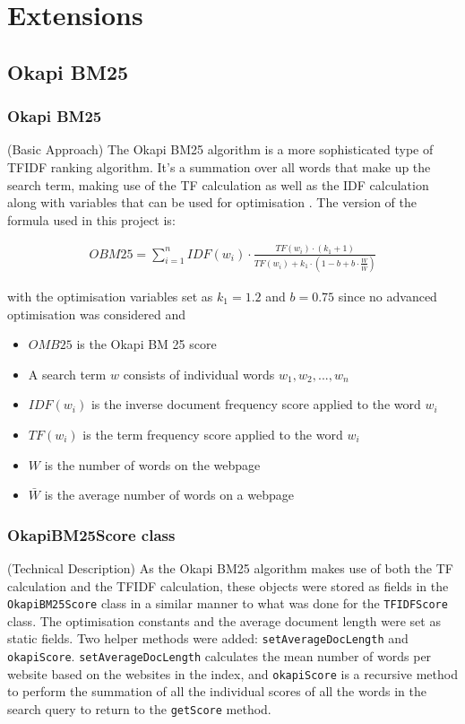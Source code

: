 \chapter{Extensions}


\section{Okapi BM25}

\subsection{Okapi BM25} (Basic Approach)
The Okapi BM25 algorithm is a more sophisticated type of TFIDF ranking algorithm.
It's a summation over all words that make up the search term, making use of the TF calculation as well as the IDF calculation along with variables that can be used for optimisation \citep{robertson2009probabilistic}.
The version of the formula used in this project is:

\begin{align}
    OBM25 = \sum_{i=1}^n IDF(w_i) \cdot \frac{TF(w_i)\cdot (k_1 + 1)}{TF(w_i) + k_1\cdot(1 - b + b\cdot \frac{W}{\bar{W}})}
\label{eq:OBM25}
\end{align}

with the optimisation variables set as $k_1 = 1.2$ and $b = 0.75$ since no advanced optimisation was considered and

\begin{itemize}
    \item $OMB25$ is the Okapi BM 25 score
    \item A search term $w$ consists of individual words $w_1, w_2, ..., w_n$
    \item $IDF(w_i)$ is the inverse document frequency score applied to the word $w_i$
    \item $TF(w_i)$ is the term frequency score applied to the word $w_i$
    \item $W$ is the number of words on the webpage
    \item $\bar{W}$ is the average number of words on a webpage
\end{itemize}

\subsection{OkapiBM25Score class} (Technical Description)
As the Okapi BM25 algorithm makes use of both the TF calculation and the TFIDF calculation, these objects were stored as fields in the {\tt OkapiBM25Score} class in a similar manner to what was done for the {\tt TFIDFScore} class.
The optimisation constants and the average document length were set as static fields.
Two helper methods were added: {\tt setAverageDocLength} and {\tt okapiScore}. {\tt setAverageDocLength} calculates the mean number of words per website based on the websites in the index, and {\tt okapiScore} is a recursive method to perform the summation of all the individual scores of all the words in the search query to return to the {\tt getScore} method.

